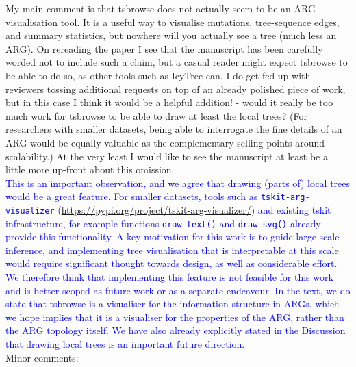 \documentclass{article}
\begin{document}
My main comment is that tsbrowse does not actually seem to be an ARG visualisation tool. It is a useful way 
to visualise mutations, tree-sequence edges, and summary statistics, but nowhere will you actually see a tree 
(much less an ARG). On rereading the paper I see that the manuscript has been carefully worded not to include 
such a claim, but a casual reader might expect tsbrowse to be able to do so, as other tools such as IcyTree can. 
I do get fed up with reviewers tossing additional requests on top of an already polished piece of work, but 
in this case I think it would be a helpful addition! - would it really be too much work for tsbrowse to be 
able to draw at least the local trees? (For researchers with smaller datasets, being able to interrogate the 
fine details of an ARG would be equally valuable as the complementary selling-points around scalability.) At 
the very least I would like to see the manuscript at least be a little more up-front about this omission.\\
\textcolor{blue}{This is an important observation, and we agree that drawing (parts of) local trees would be 
a great feature. For smaller datasets, tools such as \texttt{tskit-arg-visualizer} 
(\url{https://pypi.org/project/tskit-arg-visualizer/}) and existing tskit infrastructure, for example 
functions \texttt{draw\_text()} and \texttt{draw\_svg()} already provide this functionality. A key 
motivation for this work is to guide large-scale inference, and implementing tree visualisation that is 
interpretable at this scale would require significant thought towards design, as well as considerable effort. 
We therefore think that implementing this feature is not feasible for this work and is better scoped as future 
work or as a separate endeavour. In the text, we do state that tsbrowse is a visualiser for the information 
structure in ARGs, which we hope implies that it is a visualiser for the properties of the ARG, rather than 
the ARG topology itself. We have also already explicitly stated in the Discussion that drawing local trees is 
an important future direction.}\\

Minor comments:\\
\end{document}
